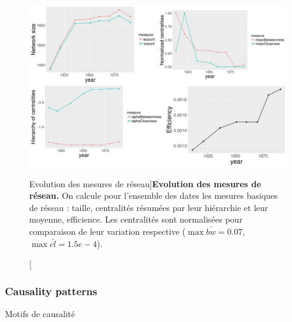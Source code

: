 \begin{figure}[h!]
\includegraphics[width=\linewidth]{Figures/Final/4-2-3-fig-causalityregimes-network.jpg}
\caption[Evolution of network measures][Evolution des mesures de réseau]{\label{fig:causalityregimes:network}}{\textbf{Evolution des mesures de réseau.} On calcule pour l'ensemble des dates les mesures basiques de réseau : taille, centralités résumées par leur hiérarchie et leur moyenne, efficience. Les centralités sont normalisées pour comparaison de leur variation respective ($\max \bar{bw} = 0.07$, $\max \bar{cl} = 1.5e-4$).\label{fig:causalityregimes:network}}
\end{figure}



\subsubsection{Causality patterns}{Motifs de causalité}


